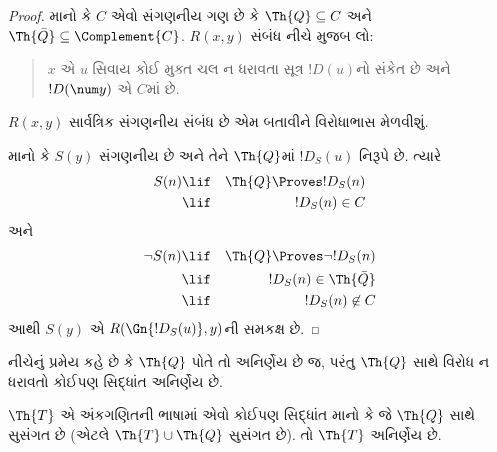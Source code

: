 \begin{proof}
માનો કે $C$ એવો સંગણનીય
ગણ છે કે $\Th{Q} \subseteq C$
અને $\Th{\bar Q} \subseteq \Complement{C}$.
$R(x,y)$ સંબંધ નીચે મુજબ લો:
\begin{quote}
$x$ એ $u$ સિવાય કોઈ મુક્ત ચલ ન ધરાવતા સૂત્ર $!D(u)$નો
સંકેત છે અને $!D(\num y)$
એ $C$માં છે.
\end{quote}
$R(x,y)$ સાર્વત્રિક
સંગણનીય સંબંધ છે એમ
બતાવીને વિરોધાભાસ
મેળવીશું.

માનો કે $S(y)$ સંગણનીય
છે અને તેને $\Th{Q}$માં
$!D_S(u)$ નિરૂપે છે.
ત્યારે
\begin{eqnarray*}
S(n) & \lif & \Th{Q} \Proves !D_S(n) \\
& \lif & !D_S(n) \in C
\end{eqnarray*}
અને
\begin{eqnarray*}
\lnot S(n) & \lif & \Th{Q} \Proves \lnot !D_S(n) \\
& \lif & !D_S(n) \in \Th{\bar Q} \\
& \lif & !D_S(n) \not\in C
\end{eqnarray*}
આથી $S(y)$ એ
$R(\Gn{!D_S(u)},y)$ની
સમકક્ષ છે.
\end{proof}
\endgroup


\begingroup
\makeatletter{}\makeatother


\label{guunit:OLP-0310}


નીચેનું પ્રમેય કહે છે કે
$\Th{Q}$ પોતે તો અનિર્ણેય
છે જ, પરંતુ $\Th{Q}$ સાથે
વિરોધ ન ધરાવતો કોઈપણ
સિદ્ધાંત અનિર્ણેય છે.

\begin{thm}
$\Th{T}$ એ અંકગણિતની
ભાષામાં એવો કોઈપણ સિદ્ધાંત
માનો કે જે $\Th{Q}$ સાથે
સુસંગત છે (એટલે
$\Th{T} \cup \Th{Q}$
સુસંગત છે). તો
$\Th{T}$ અનિર્ણેય છે.
\end{thm}

